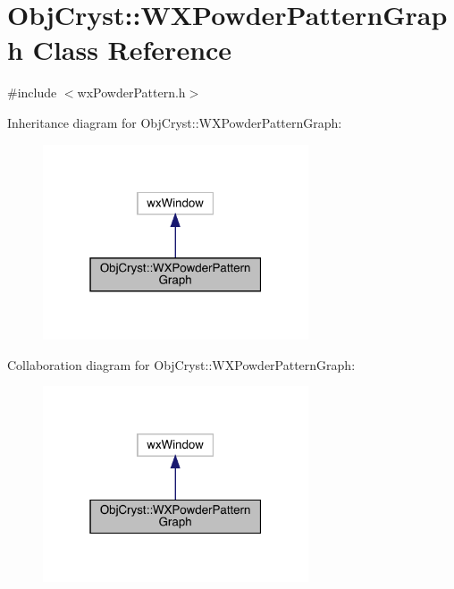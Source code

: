 \hypertarget{class_obj_cryst_1_1_w_x_powder_pattern_graph}{}\section{Obj\+Cryst\+::W\+X\+Powder\+Pattern\+Graph Class Reference}
\label{class_obj_cryst_1_1_w_x_powder_pattern_graph}


{\ttfamily \#include $<$wx\+Powder\+Pattern.\+h$>$}



Inheritance diagram for Obj\+Cryst\+::W\+X\+Powder\+Pattern\+Graph\+:
\nopagebreak
\begin{figure}[H]
\begin{center}
\leavevmode
\includegraphics[width=223pt]{class_obj_cryst_1_1_w_x_powder_pattern_graph__inherit__graph}
\end{center}
\end{figure}


Collaboration diagram for Obj\+Cryst\+::W\+X\+Powder\+Pattern\+Graph\+:
\nopagebreak
\begin{figure}[H]
\begin{center}
\leavevmode
\includegraphics[width=223pt]{class_obj_cryst_1_1_w_x_powder_pattern_graph__coll__graph}
\end{center}
\end{figure}
